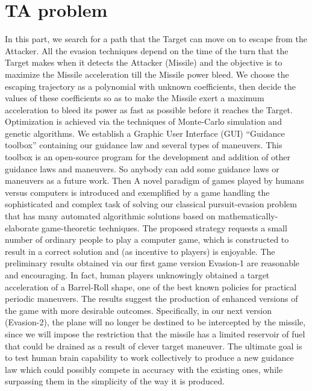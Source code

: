 \label{conclusions}

\section{TA problem}

In this part, we search for a path that the Target can move on to escape from the Attacker. All the evasion techniques depend on the time of the turn that the Target makes when it detects the Attacker (Missile) and the objective is to maximize the Missile acceleration till the Missile power bleed. We choose the escaping trajectory as a polynomial with unknown coefficients, then decide the values of these coefficients so as to make the Missile exert a maximum acceleration to bleed its power as fast as possible before it reaches the Target. Optimization is achieved via the techniques of Monte-Carlo simulation and genetic algorithms. We establish a Graphic User Interface (GUI) “Guidance toolbox” containing our guidance law and several types of maneuvers. This toolbox is an open-source program for the development and addition of other guidance laws and maneuvers. So anybody can add some guidance laws or maneuvers as a future work.
Then A novel paradigm of games played by humans versus computers is introduced and exemplified by a game handling the sophisticated and complex task of solving our classical pursuit-evasion problem that has many automated algorithmic solutions based on mathematically-elaborate game-theoretic techniques. The proposed strategy requests a small number of ordinary people to play a computer game, which is constructed to result in a correct solution and (as incentive to players) is enjoyable. The preliminary results obtained via our first game version Evasion-1 are reasonable and encouraging. In fact, human players unknowingly obtained a target acceleration of a Barrel-Roll shape, one of the best known policies for practical periodic maneuvers. The results suggest the production of enhanced versions of the game with more desirable outcomes. Specifically, in our next version (Evasion-2), the plane will no longer be destined to be intercepted by the missile, since we will impose the restriction that the missile has a limited reservoir of fuel that could be drained as a result of clever target maneuver. The ultimate goal is to test human brain capability to work collectively to produce a new guidance law which could possibly compete in accuracy with the existing ones, while surpassing them in the simplicity of the way it is produced. 

